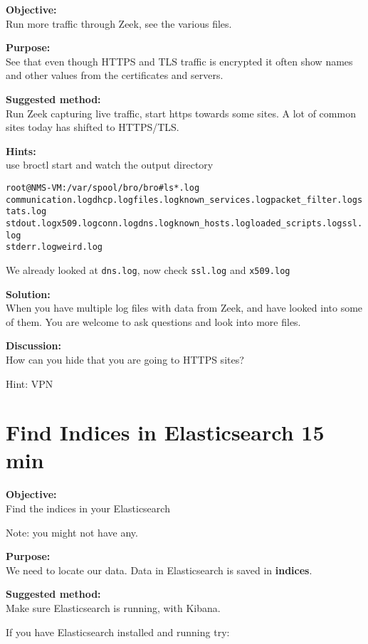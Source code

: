 \documentclass[a4paper,11pt,notitlepage]{report}
\begin{document}
{\bf Objective:} \\
Run more traffic through Zeek, see the various files.


{\bf Purpose:}\\
See that even though HTTPS and TLS traffic is encrypted it often show names and other values from the certificates and servers.


{\bf Suggested method:}\\
Run Zeek capturing live traffic, start https towards some sites. A lot of common sites today has shifted to HTTPS/TLS.


{\bf Hints:}\\
use broctl start and watch the output directory

\begin{alltt}\small
root@NMS-VM:/var/spool/bro/bro# ls *.log
communication.log  dhcp.log files.log known_services.log packet_filter.log  stats.log
stdout.log x509.log conn.log dns.log known_hosts.log loaded_scripts.log  ssl.log
stderr.log weird.log
\end{alltt}

We already looked at \verb+dns.log+, now check \verb+ssl.log+ and \verb+x509.log+

{\bf Solution:}\\
When you have multiple log files with data from Zeek, and have looked into some of them. You are welcome to ask questions and look into more files.


{\bf Discussion:}\\
How can you hide that you are going to HTTPS sites?

Hint: VPN




\chapter{Find Indices in Elasticsearch 15 min}
\label{ex:es-find-indices}

{\bf Objective:}\\
Find the indices in your Elasticsearch

Note: you might not have any.

{\bf Purpose:}\\
We need to locate our data. Data in Elasticsearch is saved in {\bf indices}.


{\bf Suggested method:}\\
Make sure Elasticsearch is running, with Kibana.

If you have Elasticsearch installed and running try: 
\end{document}
